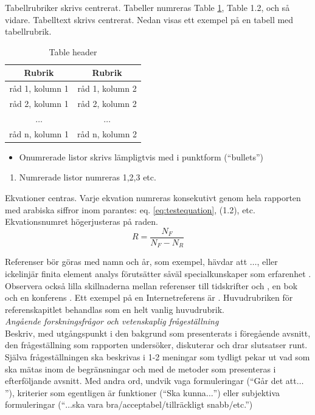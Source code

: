 \documentclass[a4paper,11pt]{kth-mag}
\begin{document}
\noindent{}Tabellrubriker skrivs centrerat. Tabeller numreras Table \ref{tab:defaulttable}, Table 1.2, och så vidare. Tabelltext skrivs centrerat. Nedan visas ett exempel på en tabell med tabellrubrik.
\begin{table}[htdp]
\caption{Table header}
\begin{center}
\begin{tabular}{cc}
\toprule
Rubrik & Rubrik \\
\midrule
råd 1, kolumn 1 & råd 1, kolumn 2 \\
råd 2, kolumn 1 & råd 2, kolumn 2 \\
$\ldots$	       & $\ldots$ \\
råd n, kolumn 1 & råd n, kolumn 2 \\
\bottomrule
\end{tabular}
\end{center}
\label{tab:defaulttable}
\end{table}%


\begin{itemize}
\item Onumrerade listor skrivs lämpligtvis med i punktform (``bullets'')
\end{itemize}

\begin{enumerate}
\item Numrerade listor numreras 1,2,3 etc.
\end{enumerate}

\noindent{}Ekvationer centras. Varje ekvation numreras konsekutivt genom hela rapporten med arabiska siffror inom parantes: eq. \eqref{eq:testequation}, (1.2), etc. Ekvationsnumret högerjusteras på raden.
\begin{equation}
R= \frac{N_F}{N_F-N_R} \label{eq:testequation}
\end{equation}

\noindent{}Referenser bör göras med namn och år, som exempel, \cite{Angell1999} hävdar att $\ldots$, eller ickelinjär finita element analys förutsätter såväl specialkunskaper som erfarenhet \cite{DeBorst2012}. Observera också lilla skillnaderna mellan referenser till tidskrifter \cite{VanWezel2001} och \cite{Angell1999}, en bok \cite{DeBorst2012} och en konferens \cite{Eppinger2001}. Ett exempel på en Internetreferens är \cite{StandishGroup1994}. Huvudrubriken för referenskapitlet behandlas som en helt vanlig huvudrubrik. \\


\noindent{}\emph{Angående forskningsfrågor och vetenskaplig frågeställning}\\
Beskriv, med utgångspunkt i den bakgrund som presenterats i föregående avsnitt, den frågeställning som rapporten undersöker, diskuterar och drar slutsatser runt. Själva frågeställningen ska beskrivas i 1-2 meningar som tydligt pekar ut vad som ska mätas inom de begränsningar och med de metoder som presenteras i efterföljande avsnitt. Med andra ord, undvik vaga formuleringar (``Går det att$\ldots$''), kriterier som egentligen är funktioner (``Ska kunna$\ldots$'') eller subjektiva formuleringar (``$\ldots$ska vara bra/acceptabel/tillräckligt snabb/etc.'')
\end{document}
